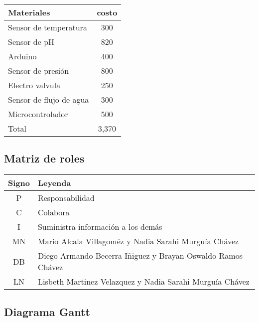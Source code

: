 \documentclass[letter,operight,12pt,spanish]{report}
\begin{document}
\begin{center}
\begin{tabular}{|l|c|}
\hline
	\textbf{Materiales} & \textbf{costo}\\
\hline
	Sensor de temperatura & 300\\
\hline
	Sensor de pH & 820\\
\hline
	Arduino & 400\\
\hline
	Sensor de presi\'on & 800\\
\hline
	Electro valvula & 250\\
\hline
	Sensor de flujo de agua & 300\\
\hline
	Microcontrolador & 500\\
\hline
	Total & 3,370\\
\hline
\end{tabular}
\end{center}

\subsection{Matriz de roles}

\begin{center}
\begin{tabular}{|c|l|}
\hline
	\textbf{Signo} & \textbf{Leyenda}\\
\hline
	P & Responsabilidad\\
\hline
	C & Colabora\\
\hline
	I & Suministra informaci\'on a los dem\'as\\
\hline
	MN & Mario Alcala Villagom\'ez y Nadia Sarahi Murgu\'ia Ch\'avez\\
\hline
	DB & Diego Armando Becerra Iñiguez y Brayan Oswaldo Ramos Ch\'avez\\
\hline
	LN & Lisbeth Martinez Velazquez y Nadia Sarahi Murgu\'ia Ch\'avez\\
\hline
\end{tabular}
\end{center}

\newpage

\subsection{Diagrama Gantt}
\end{document}
